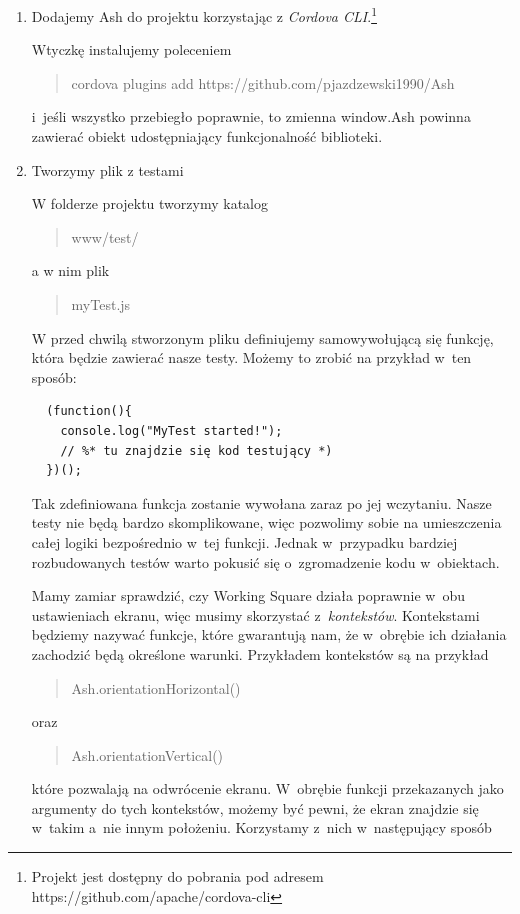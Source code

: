 \documentclass[brudnopis]{xmgr}
\begin{document}
\begin{enumerate}
  \item Dodajemy Ash do projektu korzystając z \textit{Cordova CLI}.\footnote{Projekt jest dostępny do pobrania pod adresem https://github.com/apache/cordova-cli}

Wtyczkę instalujemy poleceniem 
\begin{quote}
   cordova plugins add https://github.com/pjazdzewski1990/Ash
\end{quote}
i~jeśli wszystko przebiegło poprawnie, to zmienna window.Ash powinna zawierać obiekt udostępniający funkcjonalność biblioteki.  

 \item Tworzymy plik z testami

W folderze projektu tworzymy katalog 
\begin{quote}
www/test/
\end{quote} 
a w nim plik 
\begin{quote}
myTest.js
\end{quote} 
W przed chwilą stworzonym pliku definiujemy samowywołującą się funkcję, która będzie zawierać nasze testy. Możemy  to zrobić na przykład w~ten sposób:

 \begin{lstlisting}
  (function(){
	console.log("MyTest started!");
	// %* tu znajdzie się kod testujący *)
  })();
\end{lstlisting}

Tak zdefiniowana funkcja zostanie wywołana zaraz po jej wczytaniu. Nasze testy nie będą bardzo skomplikowane, więc pozwolimy sobie na umieszczenia całej logiki bezpośrednio w~tej funkcji. Jednak w~przypadku bardziej rozbudowanych testów warto pokusić się o~zgromadzenie kodu w~obiektach.

Mamy zamiar sprawdzić, czy Working Square działa poprawnie w~obu ustawieniach ekranu, więc musimy skorzystać z~\textit{kontekstów}. Kontekstami będziemy nazywać funkcje, które gwarantują nam, że w~obrębie ich działania zachodzić będą określone warunki. Przykładem kontekstów są na przykład

\begin{quote}
   Ash.orientationHorizontal()
\end{quote}

oraz 

\begin{quote}
   Ash.orientationVertical()
\end{quote}

które pozwalają na odwrócenie ekranu. W~obrębie funkcji przekazanych jako argumenty do tych kontekstów, możemy być pewni, że ekran znajdzie się w~takim a~nie innym położeniu. Korzystamy z~nich w~następujący sposób


\end{enumerate}
\end{document}
